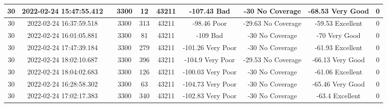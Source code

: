 \begin{longtable*}{|c|c|c|c|c|c|c|c|c|c|}
30&2022-02-24 15:47:55.412&&3300&12&43211& -107.43   Bad         & -30       No Coverage & -68.53    Very Good   & 0\\\hline
{}30&2022-02-24 16:37:59.518&&3300&313&43211& -98.46    Poor        & -29.63    No Coverage & -59.53    Excellent   & 0\\\hline
{}30&2022-02-24 16:01:05.881&&3300&81&43211& -109      Bad         & -30       No Coverage & -70       Very Good   & 0\\\hline
{}30&2022-02-24 17:47:39.184&&3300&279&43211& -101.26   Very Poor   & -30       No Coverage & -61.93    Excellent   & 0\\\hline
{}30&2022-02-24 18:02:10.687&&3300&396&43211& -104.9    Very Poor   & -29.53    No Coverage & -66.13    Very Good   & 0\\\hline
{}30&2022-02-24 18:04:02.683&&3300&126&43211& -100.03   Very Poor   & -30       No Coverage & -61.06    Excellent   & 0\\\hline
{}30&2022-02-24 16:28:58.302&&3300&63&43211& -104.73   Very Poor   & -30       No Coverage & -65.46    Very Good   & 0\\\hline
{}30&2022-02-24 17:02:17.383&&3300&340&43211& -102.83   Very Poor   & -30       No Coverage & -63.4     Excellent   & 0\\\hline

\end{longtable*}
